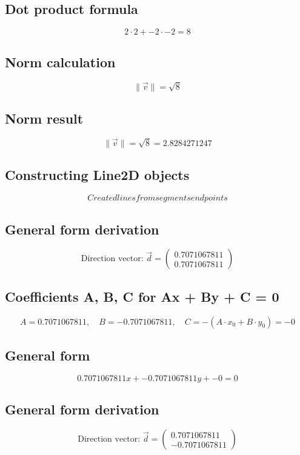 \documentclass{article}
\begin{document}
\subsection*{ \vspace{1em} Dot product formula}
\[
2 \cdot 2 + -2 \cdot -2 = 8
\]
\subsection*{ \vspace{1em} Norm calculation}
\[
\|\vec{v}\| = \sqrt{8}
\]
\subsection*{ \vspace{1em} Norm result}
\[
\|\vec{v}\| = \sqrt{8} = 2.8284271247
\]
\subsection*{ \vspace{1em} Constructing Line2D objects}
\[
Created lines from segments endpoints
\]
\subsection*{ \vspace{1em} General form derivation}
\[
\text{Direction vector: } \vec{d} = \begin{pmatrix}0.7071067811 \\ 0.7071067811\end{pmatrix}
\]
\subsection*{ \vspace{1em} Coefficients A, B, C for Ax + By + C = 0}
\[
A = 0.7071067811,\quad B = -0.7071067811,\quad C = - (A \cdot x_0 + B \cdot y_0) = -0
\]
\subsection*{ \vspace{1em} General form}
\[
0.7071067811x + -0.7071067811y + -0 = 0
\]
\subsection*{ \vspace{1em} General form derivation}
\[
\text{Direction vector: } \vec{d} = \begin{pmatrix}0.7071067811 \\ -0.7071067811\end{pmatrix}
\]
\end{document}
